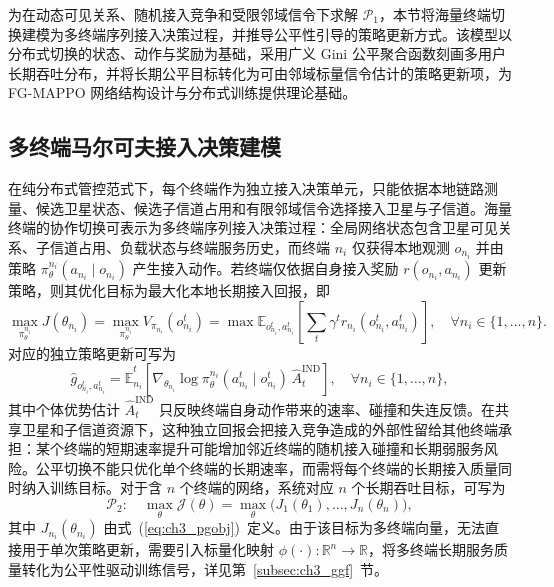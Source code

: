 为在动态可见关系、随机接入竞争和受限邻域信令下求解 $\mathcal{P}_1$，本节将海量终端切换建模为多终端序列接入决策过程，并推导公平性引导的策略更新方式。该模型以分布式切换的状态、动作与奖励为基础，采用广义 Gini 公平聚合函数刻画多用户长期吞吐分布，并将长期公平目标转化为可由邻域标量信令估计的策略更新项，为 FG-MAPPO 网络结构设计与分布式训练提供理论基础。

\subsection{多终端马尔可夫接入决策建模}
\label{subsec:ch3_momdp}

在纯分布式管控范式下，每个终端作为独立接入决策单元，只能依据本地链路测量、候选卫星状态、候选子信道占用和有限邻域信令选择接入卫星与子信道。海量终端的协作切换可表示为多终端序列接入决策过程：全局网络状态包含卫星可见关系、子信道占用、负载状态与终端服务历史，而终端 $n_i$ 仅获得本地观测 $o_{n_i}$ 并由策略 $\pi_\theta^{n_i}(a_{n_i}\mid o_{n_i})$ 产生接入动作。若终端仅依据自身接入奖励 $r(o_{n_i},a_{n_i})$ 更新策略，则其优化目标为最大化本地长期接入回报，即
\begin{equation}\label{eq:ch3_pgobj}
\max_{\pi_\theta^{n_i}} J(\theta_{n_i})=\max_{\pi_\theta^{n_i}} V_{\pi_{n_i}}(o_{n_i}^t)
=\max\mathbb{E}_{o_{n_i}^t,a_{n_i}^t}\!\left[\sum_t\gamma^t r_{n_i}(o_{n_i}^t,a_{n_i}^t)\right],\quad\forall n_i\in\{1,\dots,n\}.
\end{equation}
对应的独立策略更新可写为
\begin{equation}\label{eq:ch3_pggrad}
\hat{g}_{o_{n_i}^t,a_{n_i}^t}=\hat{\mathbb{E}}_{n_i}^t\!\left[\nabla_{\theta_{n_i}}\log\pi_\theta^{n_i}(a_{n_i}^t\mid o_{n_i}^t)\,\hat{A}_t^{\mathrm{IND}}\right],\quad\forall n_i\in\{1,\dots,n\},
\end{equation}
其中个体优势估计 $\hat{A}_t^{\mathrm{IND}}$ 只反映终端自身动作带来的速率、碰撞和失连反馈。在共享卫星和子信道资源下，这种独立回报会把接入竞争造成的外部性留给其他终端承担：某个终端的短期速率提升可能增加邻近终端的随机接入碰撞和长期弱服务风险。公平切换不能只优化单个终端的长期速率，而需将每个终端的长期接入质量同时纳入训练目标。对于含 $n$ 个终端的网络，系统对应 $n$ 个长期吞吐目标，可写为
\begin{equation}\label{eq:ch3_p2}
\mathcal{P}_2:\quad\max_\theta\mathcal{J}(\theta)=\max_\theta\big(J_1(\theta_1),\dots,J_n(\theta_n)\big),
\end{equation}
其中 $J_{n_i}(\theta_{n_i})$ 由式~(\ref{eq:ch3_pgobj})~定义。由于该目标为多终端向量，无法直接用于单次策略更新，需要引入标量化映射 $\phi(\cdot):\mathbb{R}^n\to\mathbb{R}$，将多终端长期服务质量转化为公平性驱动训练信号，详见第~\ref{subsec:ch3_ggf}~节。

